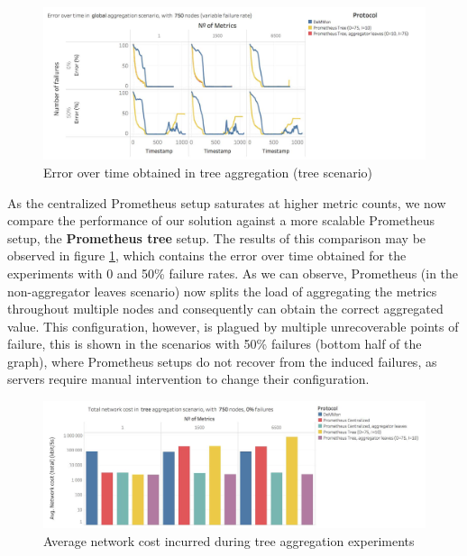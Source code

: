 \begin{figure}
    \centering
    \includegraphics[width=\linewidth]{Chapters/evaluation/figures/aggregation/Error_over_time_global_tree.jpg}
    \caption{Error over time obtained in tree aggregation (tree scenario)}
    \label{fig:sec:mon_eval_tree_tree}
\end{figure}

As the centralized Prometheus setup saturates at higher metric counts, we now compare the performance of our solution against a more scalable Prometheus setup, the \textbf{Prometheus tree} setup. The results of this comparison may be observed in figure \ref{fig:sec:mon_eval_tree_tree}, which contains the error over time obtained for the experiments with 0 and 50\% failure rates. As we can observe, Prometheus (in the non-aggregator leaves scenario) now splits the load of aggregating the metrics throughout multiple nodes and consequently can obtain the correct aggregated value. This configuration, however, is plagued by multiple unrecoverable points of failure, this is shown in the scenarios with 50\% failures (bottom half of the graph), where Prometheus setups do not recover from the induced failures, as servers require manual intervention to change their configuration.

\begin{figure}
    \centering
    \includegraphics[width=\linewidth]{Chapters/evaluation/figures/aggregation/network_cost_tree.jpg}
    \caption{Average network cost incurred during tree aggregation experiments}
    \label{fig:sec:mon_eval_tree_net_cost}
\end{figure}

